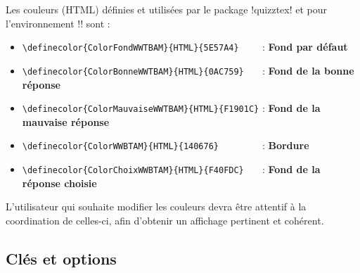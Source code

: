 \documentclass[french,a4paper,11pt]{article}
\begin{document}
\begin{tipblock}
Les couleurs (HTML) définies et utilisées par le package \packagetex!quizztex! et pour l'environnement \motcletex!\QuizzMillions! sont :

\begin{itemize}[leftmargin=*]
	\item \verb!\definecolor{ColorFondWWTBAM}{HTML}{5E57A4}    ! : \textcolor{ColorFondWWTBAM}{\textsf{\textbf{Fond par défaut}}}
	\item \verb!\definecolor{ColorBonneWWTBAM}{HTML}{0AC759}   ! : \textcolor{ColorBonneWWTBAM}{\textsf{\textbf{Fond de la bonne réponse}}}
	\item \verb!\definecolor{ColorMauvaiseWWTBAM}{HTML}{F1901C}! : \textcolor{ColorMauvaiseWWTBAM}{\textsf{\textbf{Fond de la mauvaise réponse}}}
	\item \verb!\definecolor{ColorWWBTAM}{HTML}{140676}        ! : \textcolor{ColorWWBTAM}{\textsf{\textbf{Bordure}}}
	\item \verb!\definecolor{ColorChoixWWBTAM}{HTML}{F40FDC}   ! : \textcolor{ColorChoixWWBTAM}{\textsf{\textbf{Fond de la réponse choisie}}}
\end{itemize}

L'utilisateur qui souhaite modifier les couleurs devra être attentif à la coordination de celles-ci, afin d'obtenir un affichage pertinent et cohérent.
\end{tipblock}

\begin{DemoCode}[]
\QuizzMillions{\lipsum[1][1-2]}
	{\lipsum[2][1]}{\lipsum[2][2]}{\lipsum[2][3]}{\lipsum[2][5]}
\end{DemoCode}

\subsection{Clés et options}
\end{document}
